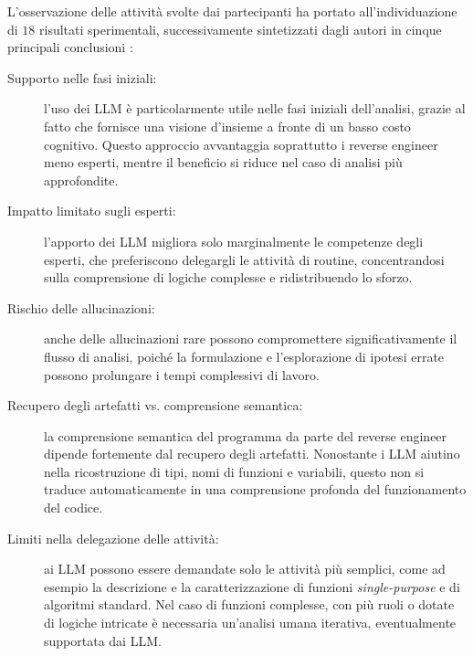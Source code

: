 
L'osservazione delle attività svolte dai partecipanti ha portato all'individuazione di $18$ risultati sperimentali, successivamente sintetizzati dagli autori in cinque principali conclusioni \cite{basque2026srellmstudy}:

\begin{description}
    \item[Supporto nelle fasi iniziali:] l'uso dei LLM è particolarmente utile nelle fasi iniziali dell'analisi, grazie al fatto che fornisce una visione d'insieme a fronte di un basso costo cognitivo. Questo approccio avvantaggia soprattutto i reverse engineer meno esperti, mentre il beneficio si riduce nel caso di analisi più approfondite.
    \item[Impatto limitato sugli esperti:] l'apporto dei LLM migliora solo marginalmente le competenze degli esperti, che preferiscono delegargli le attività di routine, concentrandosi sulla comprensione di logiche complesse e ridistribuendo lo sforzo.
    \item[Rischio delle allucinazioni:] anche delle allucinazioni rare possono compromettere significativamente il flusso di analisi, poiché la formulazione e l'esplorazione di ipotesi errate possono prolungare i tempi complessivi di lavoro.
    \item[Recupero degli artefatti vs. comprensione semantica:] la comprensione semantica del programma da parte del reverse engineer dipende fortemente dal recupero degli artefatti. Nonostante i LLM aiutino nella ricostruzione di tipi, nomi di funzioni e variabili, questo non si traduce automaticamente in una comprensione profonda del funzionamento del codice.
    \item[Limiti nella delegazione delle attività:] ai LLM possono essere demandate solo le attività più semplici, come ad esempio la descrizione e la caratterizzazione di funzioni \emph{single-purpose} e di algoritmi standard. Nel caso di funzioni complesse, con più ruoli o dotate di logiche intricate è necessaria un'analisi umana iterativa, eventualmente supportata dai LLM.
\end{description}


